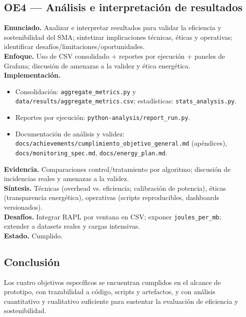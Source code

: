 \subsection*{OE4 — Análisis e interpretación de resultados}
\textbf{Enunciado.} Analizar e interpretar resultados para validar la eficiencia y sostenibilidad del SMA; sintetizar implicaciones técnicas, éticas y operativas; identificar desafíos/limitaciones/oportunidades.\\
\textbf{Enfoque.} Uso de CSV consolidado + reportes por ejecución + paneles de Grafana; discusión de amenazas a la validez y ética energética.\\
\textbf{Implementación.}
\begin{itemize}
  \item Consolidación: \texttt{aggregate\_metrics.py} y \texttt{data/results/aggregate\_metrics.csv}; estadísticas: \texttt{stats\_analysis.py}.
  \item Reportes por ejecución: \texttt{python-analysis/report\_run.py}.
  \item Documentación de análisis y validez: \texttt{docs/achievements/cumplimiento\_objetivo\_general.md} (apéndices), \texttt{docs/monitoring\_spec.md}, \texttt{docs/energy\_plan.md}.
\end{itemize}
\textbf{Evidencia.} Comparaciones control/tratamiento por algoritmo; discusión de incidencias reales y amenazas a la validez.\\
\textbf{Síntesis.} Técnicas (overhead vs. eficiencia; calibración de potencia), éticas (transparencia energética), operativas (scripts reproducibles, dashboards versionados).\\
\textbf{Desafíos.} Integrar RAPL por ventana en CSV; exponer \texttt{joules\_per\_mb}; extender a datasets reales y cargas intensivas.\\
\textbf{Estado.} Cumplido.

\subsection*{Conclusión}
Los cuatro objetivos específicos se encuentran cumplidos en el alcance de prototipo, con trazabilidad a código, scripts y artefactos, y con análisis cuantitativo y cualitativo suficiente para sustentar la evaluación de eficiencia y sostenibilidad.

